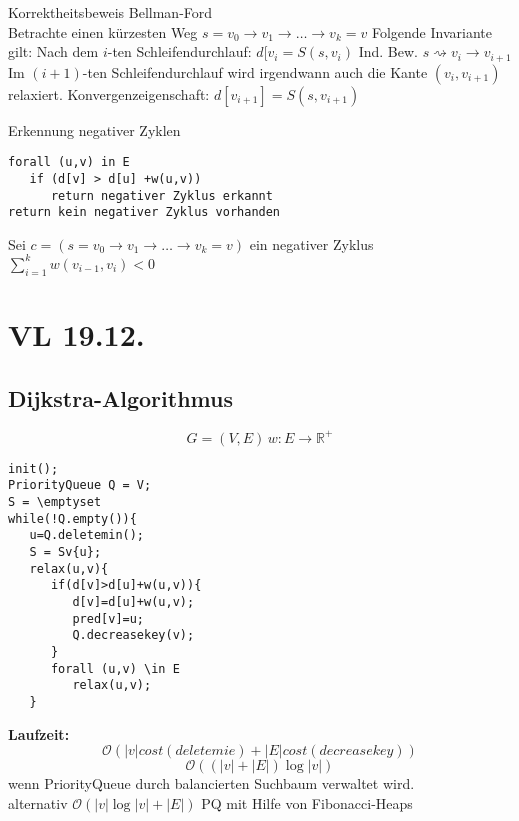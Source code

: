 \documentclass[a4paper,draft,twoside,10pt]{report}
\begin{document}
Korrektheitsbeweis Bellman-Ford\\
Betrachte einen kürzesten Weg $s=v_0\rightarrow v_1 \rightarrow \hdots \rightarrow v_k=v$
Folgende Invariante gilt: Nach dem $i$-ten Schleifendurchlauf: $d[v_i=S(s,v_i)$
Ind. Bew. 
$s \rightsquigarrow v_i \rightarrow v_{i+1}$
Im $(i+1)$-ten Schleifendurchlauf wird irgendwann auch die Kante $(v_i,v_{i+1})$ relaxiert.
Konvergenzeigenschaft: $d[v_{i+1}]=S(s,v_{i+1})$

Erkennung negativer Zyklen
\begin{verbatim}
forall (u,v) in E
   if (d[v] > d[u] +w(u,v))
      return negativer Zyklus erkannt
return kein negativer Zyklus vorhanden
\end{verbatim}
Sei $c = (s=v_0\rightarrow v_1 \rightarrow \hdots \rightarrow v_k=v)$ ein negativer Zyklus $\sum_{i=1}^k w(v_{i-1}, v_i)<0$

\chapter{VL 19.12.}
\section{Dijkstra-Algorithmus}
\[G=(V,E)\, w:E\rightarrow \mathbb R^+\]

\begin{verbatim}
init();
PriorityQueue Q = V;
S = \emptyset
while(!Q.empty()){
   u=Q.deletemin();
   S = Sv{u}; 
   relax(u,v){
      if(d[v]>d[u]+w(u,v)){
         d[v]=d[u]+w(u,v);
         pred[v]=u;
         Q.decreasekey(v);
      }
      forall (u,v) \in E
         relax(u,v);
   }
\end{verbatim}
\textbf{Laufzeit:}\\
\[\mathcal O(|v|cost(deletemie)+|E|cost(decreasekey))\]
\[\mathcal O((|v|+|E|)\log |v|)\]
wenn PriorityQueue durch balancierten Suchbaum verwaltet wird.\\[.5em]
alternativ $\mathcal O (|v|\log |v|+|E|)$ PQ mit Hilfe von Fibonacci-Heaps
\end{document}
